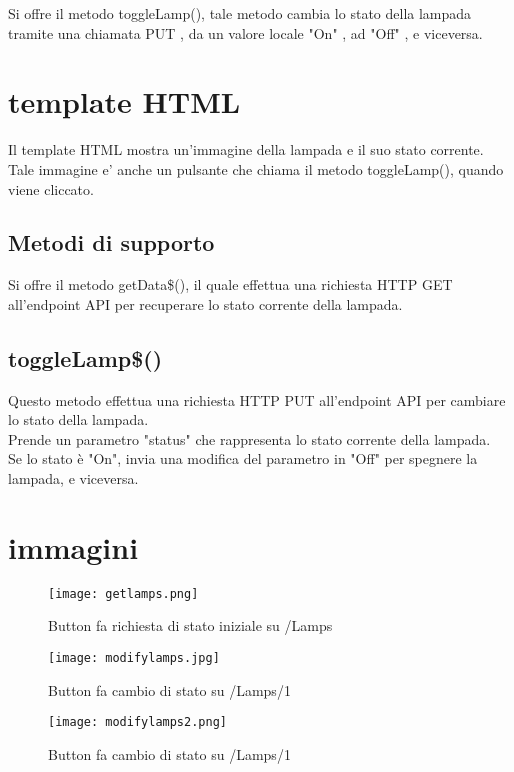 Si offre il metodo toggleLamp(), tale metodo cambia lo stato della lampada tramite una chiamata PUT , da un valore locale "On" , ad "Off" , e viceversa.

\section{template HTML}
Il template HTML mostra un'immagine della lampada e il suo stato corrente. \\
Tale immagine e' anche un pulsante che chiama il metodo toggleLamp(), quando viene cliccato.

\subsection{Metodi di supporto}
Si offre il metodo getData\$(), il quale effettua una richiesta HTTP GET all'endpoint API per recuperare lo stato corrente della lampada.

\subsection{toggleLamp\$()}
Questo metodo effettua una richiesta HTTP PUT all'endpoint API per cambiare lo stato della lampada. \\
Prende un parametro "status" che rappresenta lo stato corrente della lampada. \\
Se lo stato è "On", invia una modifica del parametro in "Off" per spegnere la lampada, e viceversa.

\section{immagini}

\begin{figure}[H]
    \centering
    \texttt{[image: getlamps.png]}
    \caption{Button fa richiesta di stato iniziale su /Lamps}
\end{figure}


\begin{figure}[H]
    \centering
    \texttt{[image: modifylamps.jpg]}
    \caption{Button fa cambio di stato su /Lamps/1}
\end{figure}

\begin{figure}[H]
    \centering
    \texttt{[image: modifylamps2.png]}
    \caption{Button fa cambio di stato su /Lamps/1}
\end{figure}
